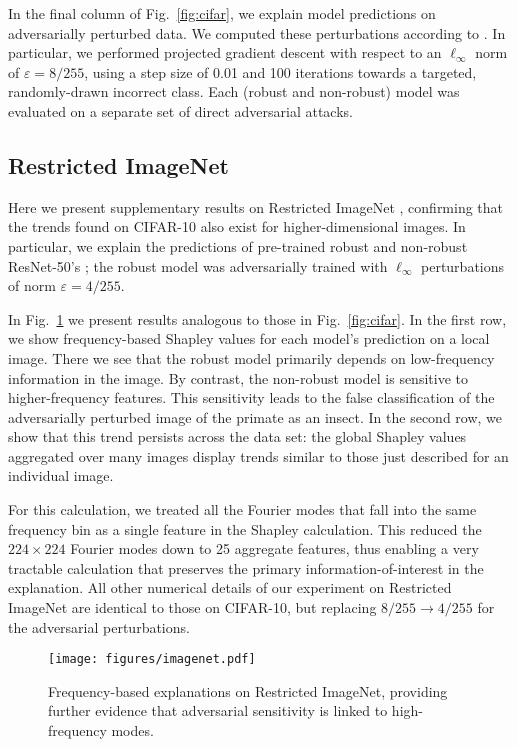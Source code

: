\documentclass{article}
\DeclareRobustCommand{\Fig}[1]{Fig.~\ref{fig:#1}}
\begin{document}
In the final column of \Fig{cifar}, we explain model predictions on adversarially perturbed data. We computed these perturbations according to \cite{robustness_github}. In particular, we performed projected gradient descent with respect to an $\ell_\infty$ norm of $\varepsilon = 8/255$, using a step size of 0.01 and 100 iterations towards a targeted, randomly-drawn incorrect class. Each (robust and non-robust) model was evaluated on a separate set of direct adversarial attacks. 


\subsection{Restricted ImageNet}
\label{app:imagenet}


Here we present supplementary results on Restricted ImageNet \citep{robustness_github}, confirming that the trends found on CIFAR-10 also exist for higher-dimensional images. In particular, we explain the predictions of pre-trained robust and non-robust ResNet-50's \citep{robustness_github}; the robust model was adversarially trained with $\ell_\infty$ perturbations of norm $\varepsilon = 4/255$.

In \Fig{imagenet} we present results analogous to those in \Fig{cifar}. In the first row, we show frequency-based Shapley values for each model's prediction on a local image. There we see that the robust model primarily depends on low-frequency information in the image. By contrast, the non-robust model is sensitive to higher-frequency features. This sensitivity leads to the false classification of the adversarially perturbed image of the primate as an insect. In the second row, we show that this trend persists across the data set: the global Shapley values aggregated over many images display trends similar to those just described for an individual image.

For this calculation, we treated all the Fourier modes that fall into the same frequency bin as a single feature in the Shapley calculation. This reduced the $224 \times 224$ Fourier modes down to 25 aggregate features, thus enabling a very tractable calculation that preserves the primary information-of-interest in the explanation. All other numerical details of our experiment on Restricted ImageNet are identical to those on CIFAR-10, but replacing $8/255 \to 4/255$ for the adversarial perturbations.


\begin{figure}
\centering
\texttt{[image: figures/imagenet.pdf]}
\caption{Frequency-based explanations on Restricted ImageNet, providing further evidence that adversarial sensitivity is linked to high-frequency modes.}
\label{fig:imagenet}
\end{figure}
\end{document}

